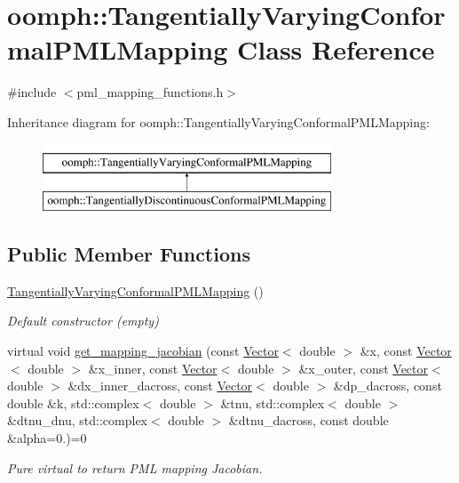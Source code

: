 \hypertarget{classoomph_1_1TangentiallyVaryingConformalPMLMapping}{}\section{oomph\+:\+:Tangentially\+Varying\+Conformal\+P\+M\+L\+Mapping Class Reference}
\label{classoomph_1_1TangentiallyVaryingConformalPMLMapping}


{\ttfamily \#include $<$pml\+\_\+mapping\+\_\+functions.\+h$>$}

Inheritance diagram for oomph\+:\+:Tangentially\+Varying\+Conformal\+P\+M\+L\+Mapping\+:\begin{figure}[H]
\begin{center}
\leavevmode
\includegraphics[height=2.000000cm]{classoomph_1_1TangentiallyVaryingConformalPMLMapping}
\end{center}
\end{figure}
\subsection*{Public Member Functions}
\begin{DoxyCompactItemize}
\item 
\hyperlink{classoomph_1_1TangentiallyVaryingConformalPMLMapping_acb092dfb7384e4cb127c496efa00ba1b}{Tangentially\+Varying\+Conformal\+P\+M\+L\+Mapping} ()
\begin{DoxyCompactList}\small\item\em Default constructor (empty) \end{DoxyCompactList}\item 
virtual void \hyperlink{classoomph_1_1TangentiallyVaryingConformalPMLMapping_aea8d1b7744dab858f96a300884bd037d}{get\+\_\+mapping\+\_\+jacobian} (const \hyperlink{classoomph_1_1Vector}{Vector}$<$ double $>$ \&x, const \hyperlink{classoomph_1_1Vector}{Vector}$<$ double $>$ \&x\+\_\+inner, const \hyperlink{classoomph_1_1Vector}{Vector}$<$ double $>$ \&x\+\_\+outer, const \hyperlink{classoomph_1_1Vector}{Vector}$<$ double $>$ \&dx\+\_\+inner\+\_\+dacross, const \hyperlink{classoomph_1_1Vector}{Vector}$<$ double $>$ \&dp\+\_\+dacross, const double \&k, std\+::complex$<$ double $>$ \&tnu, std\+::complex$<$ double $>$ \&dtnu\+\_\+dnu, std\+::complex$<$ double $>$ \&dtnu\+\_\+dacross, const double \&alpha=0.)=0
\begin{DoxyCompactList}\small\item\em Pure virtual to return P\+ML mapping Jacobian. \end{DoxyCompactList}\end{DoxyCompactItemize}


